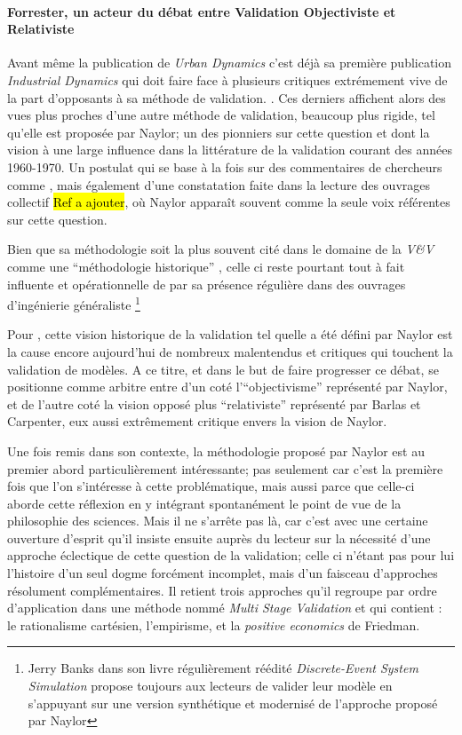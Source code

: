 \paragraph{Forrester, un acteur du débat entre Validation Objectiviste et Relativiste}
\label{p:confrontation_approches}

Avant même la publication de \textit{Urban Dynamics} c'est déjà sa première publication \textit{Industrial Dynamics} qui doit faire face à plusieurs critiques extrémement vive de la part d'opposants à sa méthode de validation. \autocite{Barlas1990}. Ces derniers affichent alors des vues plus proches d'une autre méthode de validation, beaucoup plus rigide, tel qu'elle est proposée par Naylor; un des pionniers sur cette question et dont la vision à une large influence dans la littérature de la validation courant des années 1960-1970. Un postulat qui se base à la fois sur des commentaires de chercheurs comme \autocite[1088]{Kleindorfer1998} \autocite{Nance2002}, mais également d'une constatation faite dans la lecture des ouvrages collectif \hl{Ref a ajouter}, où Naylor apparaît souvent comme la seule voix référentes sur cette question.

Bien que sa méthodologie soit la plus souvent cité dans le domaine de la \textit{V\&V} comme une \enquote{méthodologie historique} \autocite{Sargent2010}, celle ci reste pourtant tout à fait influente et opérationnelle de par sa présence régulière dans des ouvrages d'ingénierie généraliste \footnote{Jerry Banks dans son livre régulièrement réédité \textit{Discrete-Event System Simulation} propose toujours aux lecteurs de valider leur modèle en s'appuyant sur une version synthétique et modernisé de l'approche proposé par Naylor}

Pour \textcite{Kleindorfer1998}, cette vision historique de la validation tel quelle a été défini par Naylor est la cause encore aujourd'hui de nombreux malentendus et critiques qui touchent la validation de modèles. A ce titre, et dans le but de faire progresser ce débat, \textcite{Kleindorfer1998} se positionne comme arbitre entre d'un coté l'\enquote{objectivisme} représenté par Naylor, et de l'autre coté la vision opposé plus \enquote{relativiste} représenté par Barlas et Carpenter, eux aussi extrêmement critique envers la vision de Naylor.

Une fois remis dans son contexte, la méthodologie proposé par Naylor est au premier abord particulièrement intéressante; pas seulement car c'est la première fois que l'on s'intéresse à cette problématique, mais aussi parce que celle-ci aborde cette réflexion en y intégrant spontanément le point de vue de la philosophie des sciences. Mais il ne s'arrête pas là, car c'est avec une certaine ouverture d'esprit qu'il insiste ensuite auprès du lecteur sur la nécessité d'une approche éclectique de cette question de la validation; celle ci n'étant pas pour lui l'histoire d'un seul dogme forcément incomplet, mais d'un faisceau d'approches résolument complémentaires. Il retient trois approches qu'il regroupe par ordre d'application dans une méthode nommé \textit{Multi Stage Validation} et qui contient : le rationalisme cartésien, l'empirisme, et la \textit{positive economics} de Friedman.

